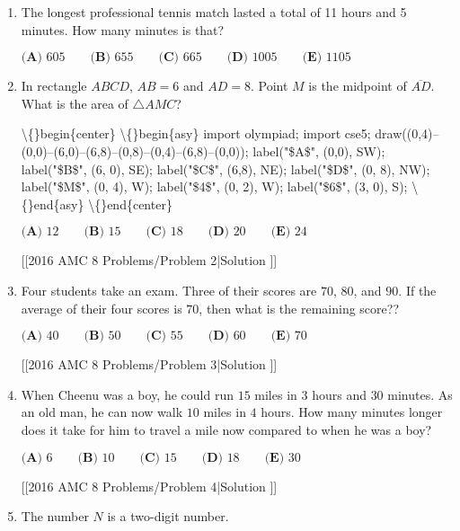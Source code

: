 \documentclass{article}
\begin{document}
\begin{enumerate}[label=\arabic*., itemsep=0.5em]\item The longest professional tennis match lasted a total of 11 hours and 5 minutes. How many minutes is that?

\(\textbf{(A) } 605 \qquad\textbf{(B) } 655\qquad\textbf{(C) } 665\qquad\textbf{(D) } 1005\qquad \textbf{(E) } 1105\)\par \vspace{0.5em}\item In rectangle \(ABCD\), \(AB=6\) and \(AD=8\).  Point \(M\) is the midpoint of \(\overline{AD}\).  What is the area of \(\triangle AMC\)?


\textbackslash\{\}begin\{center\}
\textbackslash\{\}begin\{asy\}
import olympiad;
import cse5;
draw((0,4)--(0,0)--(6,0)--(6,8)--(0,8)--(0,4)--(6,8)--(0,0));
label("\$A\$", (0,0), SW);
label("\$B\$", (6, 0), SE);
label("\$C\$", (6,8), NE);
label("\$D\$", (0, 8), NW);
label("\$M\$", (0, 4), W);
label("\$4\$", (0, 2), W);
label("\$6\$", (3, 0), S);
\textbackslash\{\}end\{asy\}
\textbackslash\{\}end\{center\}


\(\textbf{(A) }12\qquad\textbf{(B) }15\qquad\textbf{(C) }18\qquad\textbf{(D) }20\qquad \textbf{(E) }24\)

[[2016 AMC 8 Problems/Problem 2|Solution
]]\par \vspace{0.5em}\item Four students take an exam. Three of their scores are \(70\), \(80\), and \(90\). If the average of their four scores is \(70\), then what is the remaining score??

\(\textbf{(A) }40\qquad\textbf{(B) }50\qquad\textbf{(C) }55\qquad\textbf{(D) }60\qquad \textbf{(E) }70\)

[[2016 AMC 8 Problems/Problem 3|Solution
]]\par \vspace{0.5em}\item When Cheenu was a boy, he could run \(15\) miles in \(3\) hours and \(30\) minutes. As an old man, he can now walk \(10\) miles in \(4\) hours. How many minutes longer does it take for him to travel a mile now compared to when he was a boy?

\(\textbf{(A) }6\qquad\textbf{(B) }10\qquad\textbf{(C) }15\qquad\textbf{(D) }18\qquad \textbf{(E) }30\)

[[2016 AMC 8 Problems/Problem 4|Solution
]]\par \vspace{0.5em}\item The number \(N\) is a two-digit number.


\end{enumerate}
\end{document}
